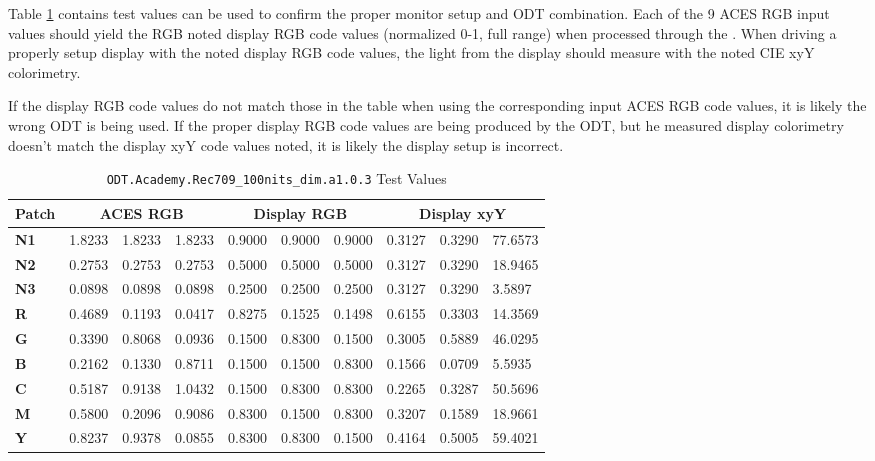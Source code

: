 Table \ref{tab:testValues-rec709} contains test values can be used to confirm the proper monitor setup and ODT combination.  Each of the 9 ACES RGB input values should yield the RGB noted display RGB code values (normalized 0-1, full range) when processed through the \texttt{}. When driving a properly setup display with the noted display RGB code values, the light from the display should measure with the noted CIE xyY colorimetry.  

If the display RGB code values do not match those in the table when using the corresponding input ACES RGB code values, it is likely the wrong ODT is being used.  If the proper display RGB code values are being produced by the ODT, but he measured display colorimetry doesn't match the display xyY code values noted, it is likely the display setup is incorrect.

\begin{table}[ht!]
    \centering
    \begin{tabular}{|l|l|l|l|l|l|l|l|l|l|}
        \hline
        \multicolumn{1}{|c|}{\textbf{Patch}} & \multicolumn{3}{c|}{\textbf{ACES RGB}} & \multicolumn{3}{c|}{\textbf{Display RGB}} & \multicolumn{3}{c|}{\textbf{Display xyY}} \\ \hline
        \textbf{N1} & 1.8233 & 1.8233 & 1.8233 & 0.9000 & 0.9000 & 0.9000 & 0.3127 & 0.3290 & 77.6573 \\ \hline
        \textbf{N2} & 0.2753 & 0.2753 & 0.2753 & 0.5000 & 0.5000 & 0.5000 & 0.3127 & 0.3290 & 18.9465 \\ \hline
        \textbf{N3} & 0.0898 & 0.0898 & 0.0898 & 0.2500 & 0.2500 & 0.2500 & 0.3127 & 0.3290 & 3.5897  \\ \hline
        \textbf{R}  & 0.4689 & 0.1193 & 0.0417 & 0.8275 & 0.1525 & 0.1498 & 0.6155 & 0.3303 & 14.3569 \\ \hline
        \textbf{G}  & 0.3390 & 0.8068 & 0.0936 & 0.1500 & 0.8300 & 0.1500 & 0.3005 & 0.5889 & 46.0295 \\ \hline
        \textbf{B}  & 0.2162 & 0.1330 & 0.8711 & 0.1500 & 0.1500 & 0.8300 & 0.1566 & 0.0709 & 5.5935  \\ \hline
        \textbf{C}  & 0.5187 & 0.9138 & 1.0432 & 0.1500 & 0.8300 & 0.8300 & 0.2265 & 0.3287 & 50.5696 \\ \hline
        \textbf{M}  & 0.5800 & 0.2096 & 0.9086 & 0.8300 & 0.1500 & 0.8300 & 0.3207 & 0.1589 & 18.9661 \\ \hline
        \textbf{Y}  & 0.8237 & 0.9378 & 0.0855 & 0.8300 & 0.8300 & 0.1500 & 0.4164 & 0.5005 & 59.4021 \\ \hline
    \end{tabular}
    \caption{ \texttt{ODT.Academy.Rec709\_100nits\_dim.a1.0.3} Test Values}
    \label{tab:testValues-rec709}
\end{table}

